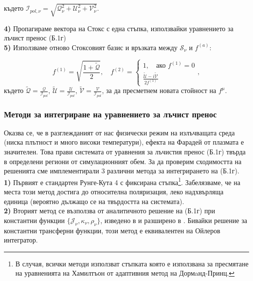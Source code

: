 \begin{appendices}
където $\mathcal{I}_{pol, \nu} = \sqrt{\mathcal{Q}_\nu^2 + \mathcal{U}_\nu^2 + \mathcal{V}_\nu^2}$.

\textbf{4)} Пропагираме вектора на Стокс с една стъпка, използвайки уравнението за лъчист пренос (Б.1г)\\
\textbf{5)} Използваме отново Стоксовият базис и връзката между $\mathcal{S}_\nu$ и $f^{(a)}$:

\begin{equation}
	f^{(1)} = \sqrt{\frac{1 + \tilde{\mathcal{Q}}}{2}}, \quad f^{(2)} = \begin{cases}
		1,\quad \text{ако}\,\,f^{(1)} = 0 \\
		\frac{\tilde{\mathcal{U}} - i\tilde{\mathcal{V}}}{2f^{(1)}}
	\end{cases},
\end{equation}
където $\tilde{\mathcal{Q}} = \frac{\mathcal{Q}}{\mathcal{I}_{pol}}$, $\tilde{\mathcal{U}} = \frac{\mathcal{U}}{\mathcal{I}_{pol}}$, $\tilde{\mathcal{V}} = \frac{\mathcal{V}}{\mathcal{I}_{pol}}$, за да пресметнем новата стойност на $f^\mu$. 

\subsubsection{Методи за интегриране на уравнението за лъчист пренос}

Оказва се, че в разглежданият от нас физически режим на излъчващата среда (ниска плътност и много високи температури), ефекта на Фарадей от плазмата е значителен. Това прави системата от уравнения за лъчистия пренос (Б.1г) твърда в определени региони от симулационният обем. За да проверим сходимостта на решенията сме имплементирали 3 различни метода за интегрирането на (Б.1г).\\

\textbf{1)} Първият е стандартен Рунге-Кута 4 с фиксирана стъпка\footnote{В случая, всички методи използват стъпката която е използвана за пресмятане на уравненията на Хамилтъон от адаптивния метод на Дормaнд-Принц.}. Забелязваме, че на места този метод достига до относителна поляризация, леко надхвърляща единица (вероятно дължащо се на твърдостта на системата).\\

\textbf{2)} Вторият метод се възползва от аналитичното решение на (Б.1г) при константни функции $\{\mathcal{J}_\nu,\kappa_\nu,\rho_\nu\}$, изведено в \cite{Landi1985} и разширено в \cite{Ipole_Code}. Бивайки решение за константни трансферни функции, този метод е еквивалентен на Ойлеров интегратор.\\


\end{appendices}
